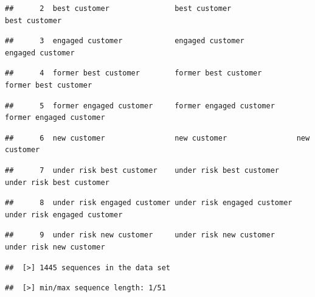\documentclass[
]{book}
\begin{document}
\begin{verbatim}
##      2  best customer               best customer               best customer
\end{verbatim}

\begin{verbatim}
##      3  engaged customer            engaged customer            engaged customer
\end{verbatim}

\begin{verbatim}
##      4  former best customer        former best customer        former best customer
\end{verbatim}

\begin{verbatim}
##      5  former engaged customer     former engaged customer     former engaged customer
\end{verbatim}

\begin{verbatim}
##      6  new customer                new customer                new customer
\end{verbatim}

\begin{verbatim}
##      7  under risk best customer    under risk best customer    under risk best customer
\end{verbatim}

\begin{verbatim}
##      8  under risk engaged customer under risk engaged customer under risk engaged customer
\end{verbatim}

\begin{verbatim}
##      9  under risk new customer     under risk new customer     under risk new customer
\end{verbatim}

\begin{verbatim}
##  [>] 1445 sequences in the data set
\end{verbatim}

\begin{verbatim}
##  [>] min/max sequence length: 1/51
\end{verbatim}
\end{document}
